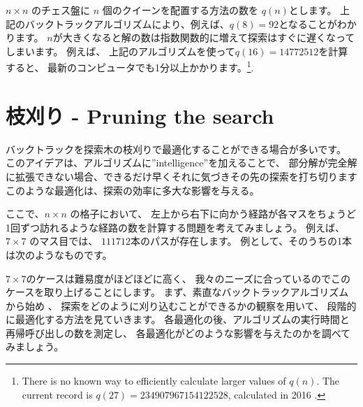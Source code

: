 $n \times n$ のチェス盤に $n$ 個のクイーンを配置する方法の数を $q(n)$とします。
上記のバックトラックアルゴリズムにより、例えば、$q(8)=92$となることがわかります。
$n$が大きくなると解の数は指数関数的に増えて探索はすぐに遅くなってしまいます。
例えば、 上記のアルゴリズムを使って$q(16)=14772512$を計算すると、
最新のコンピュータでも1分以上かかります。\footnote{There is no known way to efficiently
calculate larger values of $q(n)$. The current record is
$q(27)=234907967154122528$, calculated in 2016 \cite{q27}.}.

\section{枝刈り - Pruning the search}

バックトラックを探索木の枝刈りで最適化することができる場合が多いです。
このアイデアは、アルゴリズムに''intelligence''を加えることで、
部分解が完全解に拡張できない場合、できるだけ早くそれに気づきその先の探索を打ち切ります
このような最適化は、探索の効率に多大な影響を与える。

ここで、$n \times n$ の格子において、
左上から右下に向かう経路が各マスをちょうど1回ずつ訪れるような経路の数を計算する問題を考えてみましょう。
例えば、$7 \times 7$ のマス目では、
$111712$本のパスが存在します。
例として、そのうちの1本は次のようなものです。

\begin{center}
\end{center}

$7 \times 7$のケースは難易度がほどほどに高く、
我々のニーズに合っているのでこのケースを取り上げることにします。
まず、素直なバックトラックアルゴリズムから始め 、
探索をどのように刈り込むことができるかの観察を用いて、
段階的に最適化する方法を見ていきます。
各最適化の後、アルゴリズムの実行時間と再帰呼び出しの数を測定し、
各最適化がどのような影響を与えたのかを調べてみましょう。

